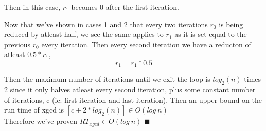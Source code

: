 \documentclass{article}
\begin{document}
\begin{enumerate}
	Then in this case, $r_1$ becomes 0 after the first iteration.
	
	Now that we've shown in cases 1 and 2 that every two iterations $r_0$ is being reduced by atleast half, we see the same applies to $r_1$ as it is set equal to the previous $r_0$ every iteration. Then every second iteration we have a reducton of atleast $0.5 * r_1$, 
	$$r_1 = r_1 * 0.5$$
	
	Then the maximum number of iterations until we exit the loop is $log_2(n)$ times 2 since it only halves atleast every second iteration, plus some constant number of iterations, c  (ie: first iteration and last iteration). Then an upper bound on the run time of xgcd is $[c + 2 * log_2(n)]\in O(log \ n)$\\ 
	
	Therefore we've proven $RT_{xgcd} \in O(log \ n)$ \null\hfill $\blacksquare$\\
	
	 
		
\end{enumerate}
\end{document}
